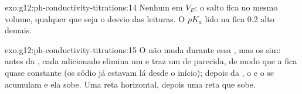 \begin{solution}{exo:g12:ph-conductivity-titrations:14}
Nenhum em $V_E$: o salto fica no mesmo volume, qualquer que seja o
desvio das leituras. O $pK_a$ lido na  fica 0.2 alto
demais.
\end{solution}

\begin{solution}{exo:g12:ph-conductivity-titrations:15}
O  não muda durante essa , mas os  sim: antes da
, cada  adicionado elimina um  e traz um
 de  parecida, de modo que a  fica
quase constante (os  sódio já estavam lá desde o início); depois da
, o  e o  se acumulam e ela sobe. Uma reta
horizontal, depois uma reta que sobe.
\end{solution}

